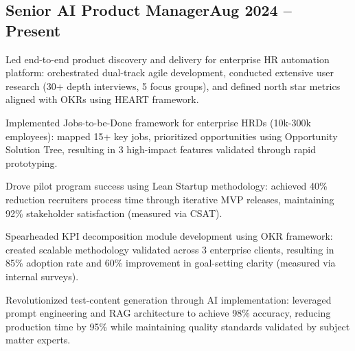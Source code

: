\documentclass[a4paper,12pt]{article}
\begin{document}
\subsection{Senior AI {Product Manager}\hfill Aug 2024 -- Present}
\begin{zitemize}
\item Led end-to-end product discovery and delivery for enterprise HR automation platform: orchestrated dual-track agile development, conducted extensive user research (30+ depth interviews, 5 focus groups), and defined north star metrics aligned with OKRs using HEART framework.
\item Implemented Jobs-to-be-Done framework for enterprise HRDs (10k-300k employees): mapped 15+ key jobs, prioritized opportunities using Opportunity Solution Tree, resulting in 3 high-impact features validated through rapid prototyping.
\item Drove pilot program success using Lean Startup methodology: achieved 40\% reduction recruiters process time through iterative MVP releases, maintaining 92\% stakeholder satisfaction (measured via CSAT).
\item Spearheaded KPI decomposition module development using OKR framework: created scalable methodology validated across 3 enterprise clients, resulting in 85\% adoption rate and 60\% improvement in goal-setting clarity (measured via internal surveys).
\item Revolutionized test-content generation through AI implementation: leveraged prompt engineering and RAG architecture to achieve 98\% accuracy, reducing production time by 95\% while maintaining quality standards validated by subject matter experts.
\end{zitemize}

\vspace*{6pt}
\end{document}
